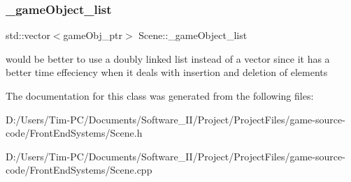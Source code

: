 \subsubsection{\texorpdfstring{\+\_\+game\+Object\+\_\+list}{\_gameObject\_list}}
{\footnotesize\ttfamily std\+::vector$<$game\+Obj\+\_\+ptr$>$ Scene\+::\+\_\+game\+Object\+\_\+list\hspace{0.3cm}{\ttfamily [private]}}

would be better to use a doubly linked list instead of a vector since it has a better time effeciency when it deals with insertion and deletion of elements 

The documentation for this class was generated from the following files\+:\begin{DoxyCompactItemize}
\item 
D\+:/\+Users/\+Tim-\/\+P\+C/\+Documents/\+Software\+\_\+\+I\+I/\+Project/\+Project\+Files/game-\/source-\/code/\+Front\+End\+Systems/Scene.\+h\item 
D\+:/\+Users/\+Tim-\/\+P\+C/\+Documents/\+Software\+\_\+\+I\+I/\+Project/\+Project\+Files/game-\/source-\/code/\+Front\+End\+Systems/Scene.\+cpp\end{DoxyCompactItemize}
